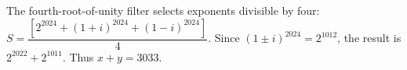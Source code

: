 The fourth-root-of-unity filter selects exponents divisible by four: $S=\dfrac{[2^{2024}+(1+i)^{2024}+(1-i)^{2024}]}{4}$. Since $(1\pm i)^{2024}=2^{1012}$, the result is $2^{2022}+2^{1011}$. Thus $x+y=\boxed{3033}$.
